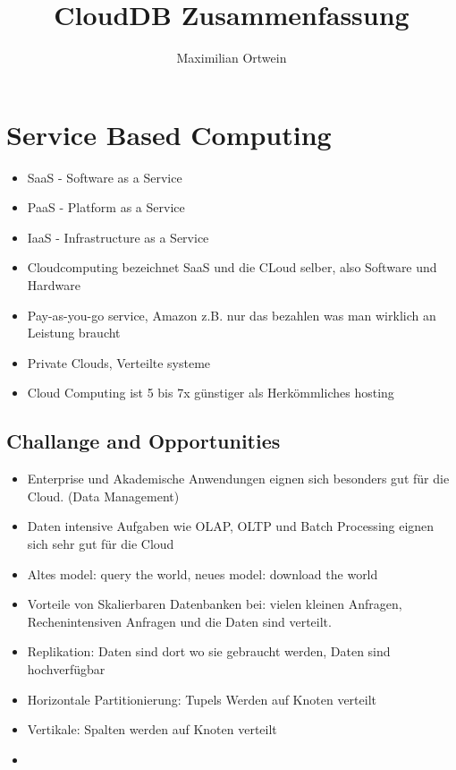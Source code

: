 \documentclass[a4paper]{scrartcl}
\begin{document}
\author{Maximilian Ortwein}
\title{CloudDB Zusammenfassung }
\fancyfoot[C]{\thepage}
\renewcommand{\footrulewidth}{0.5pt}
\renewcommand{\headrulewidth}{0.5pt}
\maketitle
\tableofcontents
\pagebreak

\section{Service Based Computing}
\begin{itemize}
\item SaaS - Software as a Service
\item PaaS - Platform as a Service
\item IaaS - Infrastructure as a Service
\item Cloudcomputing bezeichnet SaaS und die CLoud selber, also Software und Hardware
\item Pay-as-you-go service, Amazon z.B. nur das bezahlen was man wirklich an Leistung braucht
\item Private Clouds, Verteilte systeme
\item Cloud Computing ist 5 bis 7x günstiger als Herkömmliches hosting
\end{itemize}
\subsection{Challange and Opportunities}
\begin{itemize}
\item Enterprise und Akademische Anwendungen eignen sich besonders gut für die Cloud. (Data Management)
\item Daten intensive Aufgaben wie OLAP, OLTP und Batch Processing eignen sich sehr gut für die Cloud
\item Altes model: query the world, neues model: download the world
\item Vorteile von Skalierbaren Datenbanken bei: vielen kleinen Anfragen, Rechenintensiven Anfragen und die Daten sind verteilt.
\item Replikation: Daten sind dort wo sie gebraucht werden, Daten sind hochverfügbar
\item Horizontale Partitionierung: Tupels Werden auf Knoten verteilt
\item Vertikale: Spalten werden auf Knoten verteilt
\item 
\end{itemize}
\end{document}
